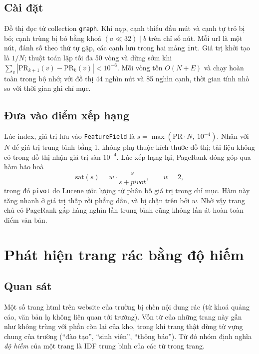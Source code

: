 \documentclass[12pt,a4paper]{report}
\begin{document}
\subsection{Cài đặt}

Đồ thị đọc từ collection \texttt{graph}. Khi nạp, cạnh thiếu đầu mút và cạnh tự trỏ bị bỏ; cạnh trùng bị bỏ bằng khoá
$(a \ll 32) \mid b$ trên chỉ số nút. Mỗi url là một nút, đánh số theo thứ tự gặp, các cạnh lưu trong hai mảng \texttt{int}.
Giá trị khởi tạo là $1/N$; thuật toán lặp tối đa 50 vòng và dừng sớm khi $\sum_v |\mathrm{PR}_{k+1}(v) - \mathrm{PR}_k(v)| <
10^{-6}$. Mỗi vòng tốn $O(N + E)$ và chạy hoàn toàn trong bộ nhớ; với đồ thị 44 nghìn nút và 85 nghìn cạnh, thời gian
tính nhỏ so với thời gian ghi chỉ mục.

\subsection{Đưa vào điểm xếp hạng}

Lúc index, giá trị lưu vào \texttt{FeatureField} là $s = \max(\mathrm{PR} \cdot N,\ 10^{-4})$. Nhân với $N$ để giá trị
trung bình bằng 1, không phụ thuộc kích thước đồ thị; tài liệu không có trong đồ thị nhận giá trị sàn $10^{-4}$. Lúc xếp
hạng lại, PageRank đóng góp qua hàm bão hoà
\begin{equation}
\mathrm{sat}(s) = w \cdot \frac{s}{s + \mathit{pivot}}, \qquad w = 2,
\end{equation}
trong đó \texttt{pivot} do Lucene ước lượng từ phân bố giá trị trong chỉ mục. Hàm này tăng nhanh ở giá trị thấp rồi
phẳng dần, và bị chặn trên bởi $w$. Nhờ vậy trang chủ có PageRank gấp hàng nghìn lần trung bình cũng không lấn át hoàn
toàn điểm văn bản.

\section{Phát hiện trang rác bằng độ hiếm}

\subsection{Quan sát}

Một số trang html trên website của trường bị chèn nội dung rác (từ khoá quảng cáo, văn bản lạ không liên quan tới
trường). Vốn từ của những trang này gần như không trùng với phần còn lại của kho, trong khi trang thật dùng từ vựng
chung của trường (``đào tạo'', ``sinh viên'', ``thông báo''). Từ đó nhóm định nghĩa \emph{độ hiếm} của một trang là IDF
trung bình của các từ trong trang.
\end{document}
